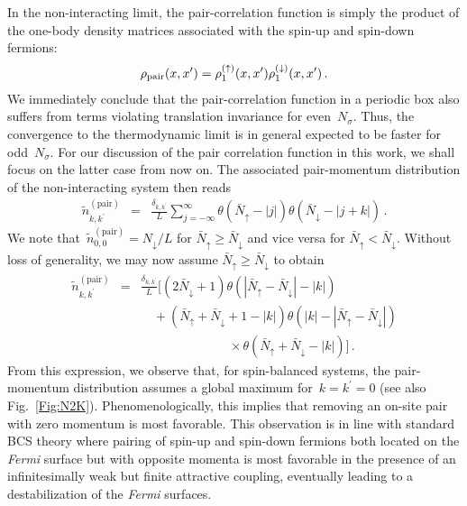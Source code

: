 \documentclass[pra,aps,groupedaddress,floatfix,twocolumn,superscriptaddress,showpacs,nofootinbib]{revtex4-1}
\newcommand{\nn}{\nonumber }
\newcommand{\be}{\begin{eqnarray}}
\newcommand{\ee}{\end{eqnarray}}
\begin{document}
{{In the non-interacting limit, the pair-correlation function is simply the product of the one-body
density matrices associated with the spin-up and spin-down fermions:
%
\be
\rho_{\rm pair}(x,x^{\prime})=\rho_1^{(\uparrow)}(x,x^{\prime})\rho_1^{(\downarrow)}(x,x^{\prime})\,.
\ee
%
We immediately conclude that the pair-correlation function in a periodic box also suffers
from terms violating translation invariance for even~$N_{\sigma}$.
Thus, the convergence to the thermodynamic limit is in general expected to be faster for odd~$N_{\sigma}$.
For our discussion of the pair correlation function in this work, we shall focus on
the latter case from now on.
The associated pair-momentum distribution of the non-interacting system then reads
%
\be
\tilde{n}_{k,k^{\prime}}^{(\text{pair})}&=&\frac{\delta_{k,k^{\prime}}}{L}\sum_{j=-\infty}^{\infty}
\theta( \bar{N}_{\uparrow}-|j|)\theta(\bar{N}_{\downarrow}-|j+k|)\,.
\ee
%
We note that~$\tilde{n}_{0,0}^{(\text{pair})}=N_{\downarrow}/L$ for $\bar{N}_{\uparrow} \geq \bar{N}_{\downarrow}$
and vice versa for $\bar{N}_{\uparrow} < \bar{N}_{\downarrow}$.
Without loss of generality, we may now assume $\bar{N}_{\uparrow} \geq \bar{N}_{\downarrow}$ to obtain
%
\be
\tilde{n}_{k,k^{\prime}}^{(\text{pair})} &=& \frac{\delta_{k,k^{\prime}}}{L} \Big[ (2\bar{N}_{\downarrow}+1)\theta( |\bar{N}_{\uparrow}-\bar{N}_{\downarrow}|-|k|)\nn\\
&& \quad + ( \bar{N}_{\uparrow}+\bar{N}_{\downarrow}+1 - |k|)\theta(|k| - |\bar{N}_{\uparrow}-\bar{N}_{\downarrow}|)\nn\\
&& \qquad\qquad\qquad\quad \times\theta( \bar{N}_{\uparrow}+\bar{N}_{\downarrow}-|k|)\Big]\,.
\label{eq:npair}
\ee
%
From this expression, we observe that, for spin-balanced systems, the pair-momentum distribution
assumes a global maximum for~$k=k^{\prime}=0$ (see also Fig.~\ref{Fig:N2K}). Phenomenologically,
this implies that removing an on-site pair with zero momentum is most favorable.
This observation is in line with standard BCS theory where pairing of spin-up and spin-down fermions both located on the
{\it Fermi} surface but with opposite momenta is most favorable
 in the presence of an infinitesimally weak but finite attractive coupling, eventually leading to a destabilization of the
{\it Fermi} surfaces.

}}
\end{document}
